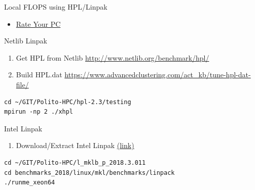 \documentclass[ignorenonframetext,]{beamer}
\providecommand{\tightlist}{%
  \setlength{\itemsep}{0pt}\setlength{\parskip}{0pt}}
\begin{document}
\begin{frame}[fragile]{Local FLOPS using HPL/Linpak}

\begin{itemize}
\tightlist
\item
  \href{http://hpl-calculator.sourceforge.net/}{Rate Your PC}
\end{itemize}

\begin{block}{Netlib Linpak}


\begin{enumerate}
\tightlist
\item
  Get HPL from Netlib \url{http://www.netlib.org/benchmark/hpl/}
\item
  Build HPL.dat
  \url{https://www.advancedclustering.com/act_kb/tune-hpl-dat-file/}
\end{enumerate}

\begin{verbatim}
cd ~/GIT/Polito-HPC/hpl-2.3/testing
mpirun -np 2 ./xhpl
\end{verbatim}

\end{block}

\begin{block}{Intel Linpak}

\begin{enumerate}
\tightlist
\item
  Download/Extract Intel Linpak
  \href{https://software.intel.com/en-us/articles/intel-mkl-benchmarks-suite}{(link)}
\end{enumerate}

\begin{verbatim}
cd ~/GIT/Polito-HPC/l_mklb_p_2018.3.011
cd benchmarks_2018/linux/mkl/benchmarks/linpack
./runme_xeon64
\end{verbatim}


\end{block}

\end{frame}
\end{document}
